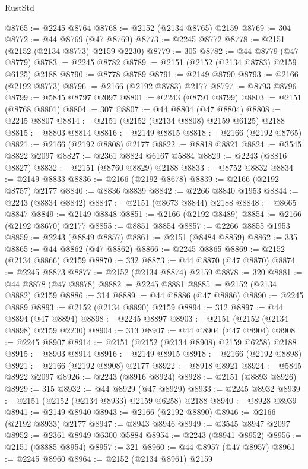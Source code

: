 \begin{lexlean}{RustStd}
\begin{coremodule}
@8765 := @2245 @8764
@8768 := @2152 (@2134 @8765) @2159
@8769 := 304
@8772 := @44 @8769 (@47 @8769)
@8773 := @2245 @8772
@8778 := @2151 (@2152 (@2134 @8773) @2159 @2230)
@8779 := 305
@8782 := @44 @8779 (@47 @8779)
@8783 := @2245 @8782
@8789 := @2151 (@2152 (@2134 @8783) @2159 @6125) @2188
@8790 := @8778 @8789
@8791 := @2149 @8790
@8793 := @2166 (@2192 @8773)
@8796 := @2166 (@2192 @8783) @2177
@8797 := @8793 @8796
@8799 := @5845 @8797 @2097
@8801 := @2243 (@8791 @8799)
@8803 := @2151 (@8768 @8801)
@8804 := 307
@8807 := @44 @8804 (@47 @8804)
@8808 := @2245 @8807
@8814 := @2151 (@2152 (@2134 @8808) @2159 @6125) @2188
@8815 := @8803 @8814
@8816 := @2149 @8815
@8818 := @2166 (@2192 @8765)
@8821 := @2166 (@2192 @8808) @2177
@8822 := @8818 @8821
@8824 := @3545 @8822 @2097
@8827 := @2361 @8824 @6167 @5884
@8829 := @2243 (@8816 @8827)
@8832 := @2151 (@8760 @8829) @2188
@8833 := @8752 @8832
@8834 := @2149 @8833
@8836 := @2166 (@2192 @8678)
@8839 := @2166 (@2192 @8757) @2177
@8840 := @8836 @8839
@8842 := @2266 @8840 @1953
@8844 := @2243 (@8834 @8842)
@8847 := @2151 (@8673 @8844) @2188
@8848 := @8665 @8847
@8849 := @2149 @8848
@8851 := @2166 (@2192 @8489)
@8854 := @2166 (@2192 @8670) @2177
@8855 := @8851 @8854
@8857 := @2266 @8855 @1953
@8859 := @2243 (@8849 @8857)
@8861 := @2151 (@8484 @8859)
@8862 := 335
@8865 := @44 @8862 (@47 @8862)
@8866 := @2245 @8865
@8869 := @2152 (@2134 @8866) @2159
@8870 := 332
@8873 := @44 @8870 (@47 @8870)
@8874 := @2245 @8873
@8877 := @2152 (@2134 @8874) @2159
@8878 := 320
@8881 := @44 @8878 (@47 @8878)
@8882 := @2245 @8881
@8885 := @2152 (@2134 @8882) @2159
@8886 := 314
@8889 := @44 @8886 (@47 @8886)
@8890 := @2245 @8889
@8893 := @2152 (@2134 @8890) @2159
@8894 := 312
@8897 := @44 @8894 (@47 @8894)
@8898 := @2245 @8897
@8903 := @2151 (@2152 (@2134 @8898) @2159 @2230)
@8904 := 313
@8907 := @44 @8904 (@47 @8904)
@8908 := @2245 @8907
@8914 := @2151 (@2152 (@2134 @8908) @2159 @6258) @2188
@8915 := @8903 @8914
@8916 := @2149 @8915
@8918 := @2166 (@2192 @8898)
@8921 := @2166 (@2192 @8908) @2177
@8922 := @8918 @8921
@8924 := @5845 @8922 @2097
@8926 := @2243 (@8916 @8924)
@8928 := @2151 (@8893 @8926)
@8929 := 315
@8932 := @44 @8929 (@47 @8929)
@8933 := @2245 @8932
@8939 := @2151 (@2152 (@2134 @8933) @2159 @6258) @2188
@8940 := @8928 @8939
@8941 := @2149 @8940
@8943 := @2166 (@2192 @8890)
@8946 := @2166 (@2192 @8933) @2177
@8947 := @8943 @8946
@8949 := @3545 @8947 @2097
@8952 := @2361 @8949 @6300 @5884
@8954 := @2243 (@8941 @8952)
@8956 := @2151 (@8885 @8954)
@8957 := 321
@8960 := @44 @8957 (@47 @8957)
@8961 := @2245 @8960
@8964 := @2152 (@2134 @8961) @2159

\end{coremodule}
\end{lexlean}
